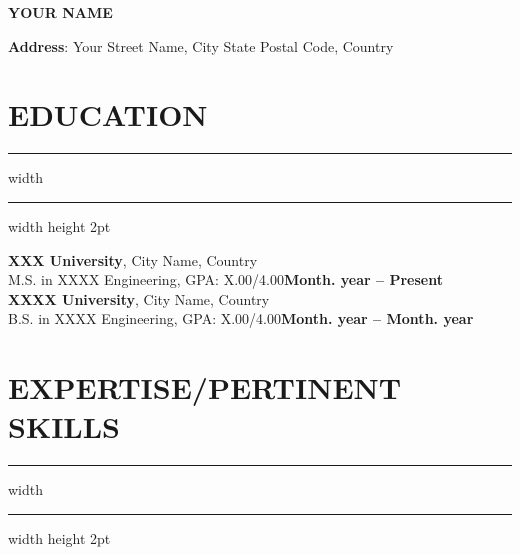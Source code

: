 \documentclass[12pt]{article}
\begin{document}
	\begin{center}
		\textbf{\LARGE{Y}\large{OUR} \LARGE{N}\large{AME}}
    \end{center}
	\vspace{-4mm}
	\begin{center}
		\textbf{Address}: Your Street Name, City State Postal Code, Country
	\end{center}
	\vspace{-6mm}
	\begin{multicols}{2}
	\end{multicols}

	\vspace{-4mm}
	\section*{\textbf{\Large E}\normalsize DUCATION}
	\vspace{-2mm}
	\hrule width \hsize \kern 1mm \hrule width \hsize height 2pt
	\vspace{2mm}

	\begin{flushleft}
		\textbf{XXX University}, City Name, Country\\
		\hspace{5pt}M.S. in XXXX Engineering, GPA: X.00/4.00\hspace{130pt}\textbf{Month. year -- Present}\\
		\textbf{XXXX University}, City Name, Country\\
		\hspace{5pt}B.S. in XXXX Engineering, GPA: X.00/4.00\hspace{103pt}\textbf{Month. year -- Month. year}\\
	\end{flushleft}

	\vspace{-4mm}
	\section*{\textbf{\Large E}\normalsize XPERTISE/{\Large P}ERTINENT {\Large S}KILLS}
	\vspace{-2mm}
	\hrule width \hsize \kern 1mm \hrule width \hsize height 2pt
	\vspace{2mm}
\end{document}
